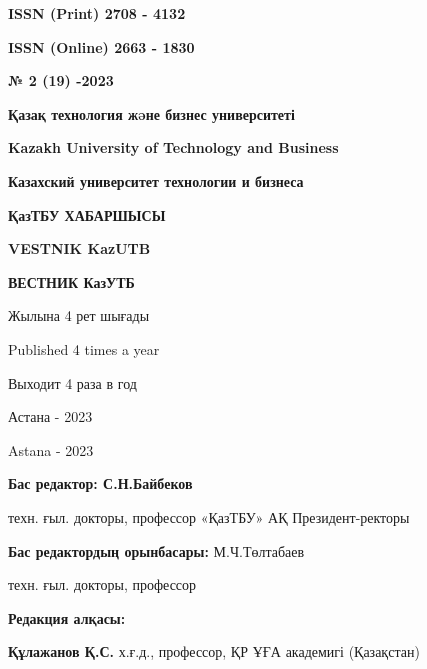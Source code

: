 \begin{flushright}
\textbf{ISSN (Print) 2708 - 4132}

\textbf{ISSN (Online) 2663 - 1830}

\vspace{1cm}

\textbf{№ 2 (19) -2023}
\end{flushright}

\vfill

\begin{center}
\textbf{\large Қазақ технология жəне бизнес университеті}

\vspace{0.3cm}

\textbf{\large Kazakh University of Technology and Business}

\vspace{0.3cm}

\textbf{\large Казахский университет технологии и бизнеса}

\vfill

\textbf{\huge ҚазТБУ ХАБАРШЫСЫ}

\vspace{0.5cm}

\textbf{\huge VESTNIK KazUTB}

\vspace{0.5cm}

\textbf{\huge ВЕСТНИК КазУТБ}

\vfill

Жылына 4 рет шығады

Published 4 times a year

Выходит 4 раза в год

\vfill

Астана - 2023

Astana - 2023
\end{center}

\pagebreak

\begin{center}
\textbf{Бас редактор: С.Н.Байбеков}

техн. ғыл. докторы, профессор «ҚазТБУ» АҚ Президент-ректоры

\textbf{Бас редактордың орынбасары:} М.Ч.Төлтабаев

техн. ғыл. докторы, профессор

\textbf{Редакция алқасы:}
\end{center}

\textbf{Құлажанов Қ.С.} х.ғ.д., профессор, ҚР ҰҒА академигі (Қазақстан)

